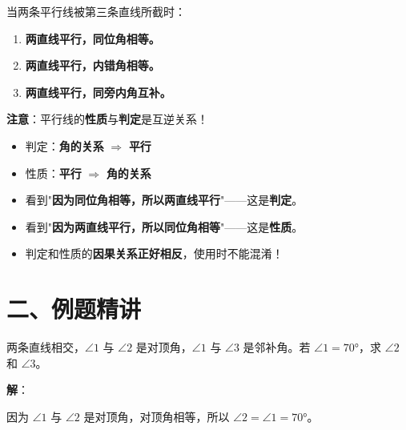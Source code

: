 \documentclass[12pt, a4paper]{ctexart}
\begin{document}
\begin{knowledgebox}
当两条平行线被第三条直线所截时：

\begin{enumerate}[leftmargin=2em]
  \item \textbf{两直线平行，同位角相等。}
  \item \textbf{两直线平行，内错角相等。}
  \item \textbf{两直线平行，同旁内角互补。}
\end{enumerate}

\textbf{注意}：平行线的\textbf{性质}与\textbf{判定}是互逆关系！
\begin{itemize}[leftmargin=2em]
  \item 判定：\textbf{角的关系} $\Rightarrow$ \textbf{平行}
  \item 性质：\textbf{平行} $\Rightarrow$ \textbf{角的关系}
\end{itemize}
\end{knowledgebox}

\begin{warnbox}
\begin{itemize}[leftmargin=2em]
  \item 看到"\textbf{因为同位角相等，所以两直线平行}"——这是\textbf{判定}。
  \item 看到"\textbf{因为两直线平行，所以同位角相等}"——这是\textbf{性质}。
  \item 判定和性质的\textbf{因果关系正好相反}，使用时不能混淆！
\end{itemize}
\end{warnbox}

\section*{\textcolor{examorange}{二、例题精讲}}

\begin{examplebox}[【例题1】对顶角与邻补角的基本计算]
两条直线相交，$\angle 1$ 与 $\angle 2$ 是对顶角，$\angle 1$ 与 $\angle 3$ 是邻补角。若 $\angle 1 = 70°$，求 $\angle 2$ 和 $\angle 3$。
\end{examplebox}

\textbf{解}：

因为 $\angle 1$ 与 $\angle 2$ 是对顶角，对顶角相等，所以 $\angle 2 = \angle 1 = 70°$。
\end{document}
